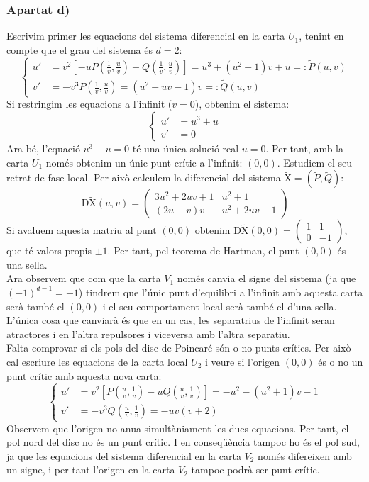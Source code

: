 \documentclass[10pt,a4paper]{article}
\newcommand{\vf}[1]{\boldsymbol{\mathrm{#1}}} %
\begin{document}
\subsubsection*{Apartat d)}
Escrivim primer les equacions del sistema diferencial en la carta $U_1$, tenint en compte que el grau del sistema és $d=2$:
$$
  \left\{
  \begin{aligned}
    u' & =v^2\left[-uP\left(\frac{1}{v},\frac{u}{v}\right)+Q\left(\frac{1}{v},\frac{u}{v}\right)\right]=u^3+(u^2+1)v+u=:\tilde{P}(u,v) \\
    v' & =-v^3P\left(\frac{1}{v},\frac{u}{v}\right)=(u^2+uv-1)v=:\tilde{Q}(u,v)
  \end{aligned}
  \right.
$$
Si restringim les equacions a l'infinit ($v=0$), obtenim el sistema:
$$
  \left\{
  \begin{aligned}
    u' & =u^3+u \\
    v' & =0
  \end{aligned}
  \right.
$$
Ara bé, l'equació $u^3+u=0$ té una única solució real $u=0$. Per tant, amb la carta $U_1$ només obtenim un únic punt crític a l'infinit: $(0,0)$. Estudiem el seu retrat de fase local. Per això calculem la diferencial del sistema $\vf{\tilde{X}}=(\tilde{P},\tilde{Q})$:
$$\vf{D\tilde{X}}(u,v)=\begin{pmatrix}
    3u^2+2uv+1 & u^2+1     \\
    (2u+v)v    & u^2+2uv-1
  \end{pmatrix}$$
Si avaluem aquesta matriu al punt $(0,0)$ obtenim $\vf{D\tilde{X}}(0,0)=\begin{pmatrix}
    1 & 1  \\
    0 & -1
  \end{pmatrix}$, que té valors propis $\pm 1$. Per tant, pel teorema de Hartman, el punt $(0,0)$ és una sella.\\
Ara observem que com que la carta $V_1$ només canvia el signe del sistema (ja que ${(-1)}^{d-1}=-1$) tindrem que l'únic punt d'equilibri a l'infinit amb aquesta carta serà també el $(0,0)$ i el seu comportament local serà també el d'una sella. L'única cosa que canviarà és que en un cas, les separatrius de l'infinit seran atractores i en l'altra repulsores i viceversa amb l'altra separatiu.\\
Falta comprovar si els pols del disc de Poincaré són o no punts crítics. Per això cal escriure les equacions de la carta local $U_2$ i veure si l'origen $(0,0)$ és o no un punt crític amb aquesta nova carta:
$$
  \left\{
  \begin{aligned}
    u' & =v^2\left[P\left(\frac{u}{v},\frac{1}{v}\right)-uQ\left(\frac{u}{v},\frac{1}{v}\right)\right]=-u^2-(u^2+1)v-1 \\
    v' & =-v^3Q\left(\frac{u}{v},\frac{1}{v}\right)=-uv(v+2)
  \end{aligned}
  \right.
$$
Observem que l'origen no anu\lgem a simultàniament les dues equacions. Per tant, el pol nord del disc no és un punt crític. I en conseqüència tampoc ho és el pol sud, ja que les equacions del sistema diferencial en la carta $V_2$ només difereixen amb un signe, i per tant l'origen en la carta $V_2$ tampoc podrà ser punt crític.
\end{document}
